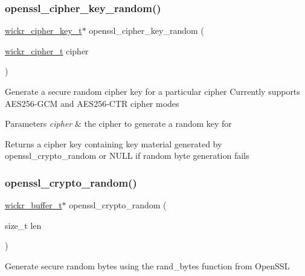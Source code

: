 \subsubsection{\texorpdfstring{openssl\+\_\+cipher\+\_\+key\+\_\+random()}{openssl\_cipher\_key\_random()}}
{\footnotesize\ttfamily \mbox{\hyperlink{structwickr__cipher__key}{wickr\+\_\+cipher\+\_\+key\+\_\+t}}$\ast$ openssl\+\_\+cipher\+\_\+key\+\_\+random (\begin{DoxyParamCaption}\item[{\mbox{\hyperlink{structwickr__cipher}{wickr\+\_\+cipher\+\_\+t}}}]{cipher }\end{DoxyParamCaption})}

Generate a secure random cipher key for a particular cipher Currently supports A\+E\+S256-\/\+G\+CM and A\+E\+S256-\/\+C\+TR cipher modes


\begin{DoxyParams}{Parameters}
{\em cipher} & the cipher to generate a random key for \\
\hline
\end{DoxyParams}
\begin{DoxyReturn}{Returns}
a cipher key containing key material generated by \textquotesingle{}openssl\+\_\+crypto\+\_\+random\textquotesingle{} or N\+U\+LL if random byte generation fails 
\end{DoxyReturn}
\mbox{\label{group__openssl__crypto_gadfe740d19f9f2096b818553e90dae0d7}} 
\subsubsection{\texorpdfstring{openssl\+\_\+crypto\+\_\+random()}{openssl\_crypto\_random()}}
{\footnotesize\ttfamily \mbox{\hyperlink{structwickr__buffer}{wickr\+\_\+buffer\+\_\+t}}$\ast$ openssl\+\_\+crypto\+\_\+random (\begin{DoxyParamCaption}\item[{size\+\_\+t}]{len }\end{DoxyParamCaption})}

Generate secure random bytes using the rand\+\_\+bytes function from Open\+S\+SL


